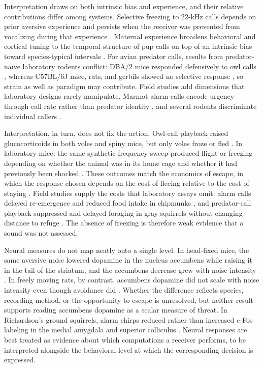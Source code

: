 Interpretation draws on both intrinsic bias and experience, and their relative contributions differ among systems. Selective freezing to 22-kHz calls depends on prior aversive experience \citep{KimEtAl2010,EndresEtAl2007} and persists when the receiver was prevented from vocalizing during that experience \citep{CalubEtAl2018}. Maternal experience broadens behavioral and cortical tuning to the temporal structure of pup calls on top of an intrinsic bias toward species-typical intervals \citep{SchiavoEtAl2020}. For avian predator calls, results from predator-naïve laboratory rodents conflict: DBA/2 mice responded defensively to owl calls \citep{HendrieNeill1991}, whereas C57BL/6J mice, rats, and gerbils showed no selective response \citep{KindermannEtAl2009}, so strain as well as paradigm may contribute.
Field studies add dimensions that laboratory designs rarely manipulate. Marmot alarm calls encode urgency through call rate rather than predator identity \citep{BlumsteinArmitage1997}, and several rodents discriminate individual callers \citep{Hare1998,BlumsteinDaniel2004,VielleEtAl2021,WarrenEtAl2025}.

Interpretation, in turn, does not fix the action. Owl-call playback raised glucocorticoids in both voles and spiny mice, but only voles froze or fled \citep{EilamEtAl1999}. In laboratory mice, the same synthetic frequency sweep produced flight or freezing depending on whether the animal was in its home cage and whether it had previously been shocked \citep{MongeauEtAl2003}. These outcomes match the economics of escape, in which the response chosen depends on the cost of fleeing relative to the cost of staying \citep{YdenbergDill1986}. Field studies supply the costs that laboratory assays omit: alarm calls delayed re-emergence and reduced food intake in chipmunks \citep{BaackSwitzer2000}, and predator-call playback suppressed and delayed foraging in gray squirrels without changing distance to refuge \citep{JayneEtAl2015}. The absence of freezing is therefore weak evidence that a sound was not assessed.

Neural measures do not map neatly onto a single level. In head-fixed mice, the same aversive noise lowered dopamine in the nucleus accumbens while raising it in the tail of the striatum, and the accumbens decrease grew with noise intensity \citep{FuruyamaEtAl2026}. In freely moving rats, by contrast, accumbens dopamine did not scale with noise intensity even though avoidance did \citep{GoedhoopEtAl2022}. Whether the difference reflects species, recording method, or the opportunity to escape is unresolved, but neither result supports reading accumbens dopamine as a scalar measure of threat.
In Richardson's ground squirrels, alarm chirps reduced rather than increased c-Fos labeling in the medial amygdala and superior colliculus \citep{FreemanEtAl2020}. Neural responses are best treated as evidence about which computations a receiver performs, to be interpreted alongside the behavioral level at which the corresponding decision is expressed.


